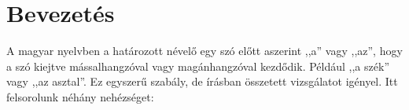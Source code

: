 \documentclass[12pt]{article}
\def\huqq#1{,,{\color{gray}#1}''}
\theoremstyle{definition}
\begin{document}
\section{Bevezetés}

A magyar nyelvben a határozott névelő egy szó előtt aszerint \huqq{a} vagy \huqq{az}, hogy a szó kiejtve mássalhangzóval vagy magánhangzóval kezdődik.
Például \huqq{a szék} vagy \huqq{az asztal}.
Ez egyszerű szabály, de írásban összetett vizsgálatot igényel.
Itt felsorolunk néhány nehézséget:
\end{document}
